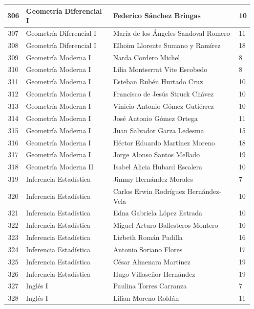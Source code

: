 {\begin{longtable}{|c|p{6.5cm}|p{5cm}|p{1.5cm}|}
  306 & Geometría Diferencial I & Federico Sánchez Bringas & 10 \\ \hline
  307 & Geometría Diferencial I & María de los Ángeles Sandoval Romero & 11 \\ \hline
  308 & Geometría Diferencial I & Elhoim Llorente Sumano y Ramírez & 18 \\ \hline
  309 & Geometría Moderna I & Narda Cordero Michel & 8 \\ \hline
  310 & Geometría Moderna I & Lilia Montserrat Vite Escobedo & 8 \\ \hline
  311 & Geometría Moderna I & Esteban Rubén Hurtado Cruz & 10 \\ \hline
  312 & Geometría Moderna I & Francisco de Jesús Struck Chávez & 10 \\ \hline
  313 & Geometría Moderna I & Vinicio Antonio Gómez Gutiérrez & 10 \\ \hline
  314 & Geometría Moderna I & José Antonio Gómez Ortega & 11 \\ \hline
  315 & Geometría Moderna I & Juan Salvador Garza Ledesma & 15 \\ \hline
  316 & Geometría Moderna I & Héctor Eduardo Martínez Moreno & 18 \\ \hline
  317 & Geometría Moderna I & Jorge Alonso Santos Mellado & 19 \\ \hline
  318 & Geometría Moderna II & Isabel Alicia Hubard Escalera & 10 \\ \hline
  319 & Inferencia Estadística & Jimmy Hernández Morales & 7 \\ \hline
  320 & Inferencia Estadística & Carlos Erwin Rodríguez Hernández-Vela & 10 \\ \hline
  321 & Inferencia Estadística & Edna Gabriela López Estrada & 10 \\ \hline
  322 & Inferencia Estadística & Miguel Arturo Ballesteros Montero & 10 \\ \hline
  323 & Inferencia Estadística & Lizbeth Román Padilla & 16 \\ \hline
  324 & Inferencia Estadística & Antonio Soriano Flores & 17 \\ \hline
  325 & Inferencia Estadística & César Almenara Martínez & 19 \\ \hline
  326 & Inferencia Estadística & Hugo Villaseñor Hernández & 19 \\ \hline
  327 & Inglés I & Paulina Torres Carranza & 7 \\ \hline
  328 & Inglés I & Lilian Moreno Roldán & 11 \\ \hline

\end{longtable}}

